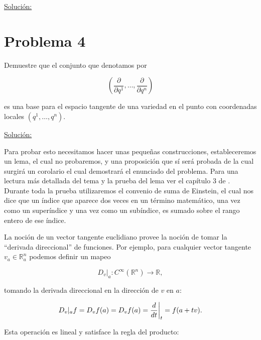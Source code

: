 \documentclass[a4paper,10pt]{article}
\numberwithin{equation}{section}
\newcommand{\zerodel}{.\kern-\nulldelimiterspace}
\begin{document}
\vspace{.3cm}

\underline{Solución:} \vspace{.3cm}

\section{Problema 4}

Demuestre que el conjunto que denotamos por 

$$
\left( \frac{\partial}{\partial q^1},\dots, \frac{\partial}{\partial q^n}\right)
$$

es una base para el espacio tangente de una variedad en el punto con coordenadas 
locales $(q^1,\dots,q^n)$.

\vspace{.3cm}

\underline{Solución:} \vspace{.3cm}

Para probar esto necesitamos hacer unas pequeñas construcciones, estableceremos un 
lema, el cual no probaremos, y una proposición que sí será probada de la cual 
surgirá un corolario el cual demostrará el enunciado del problema. Para una lectura 
más detallada del tema y la prueba del lema ver el capítulo 3 de \cite{lee}. Durante 
toda la prueba utilizaremos el convenio de suma de Einstein, el cual nos dice 
que un índice que aparece dos veces en un término matemático, una vez como un 
superíndice y una vez como un subíndice, es sumado sobre el rango entero de ese 
índice. 

\vspace{.3cm}

La noción de un vector tangente euclidiano provee la noción de tomar la ``derivada 
direccional'' de funciones. Por ejemplo, para cualquier vector tangente $v_a \in \mathbb{R}^n_a$ 
podemos definir un mapeo 

\begin{equation}
 D_v|_a: C^{\infty}(\mathbb{R}^n) \rightarrow \mathbb{R},
\end{equation}

tomando la derivada direccional en la dirección de $v$ en $a$:

\begin{equation}
 D_v|_a f = D_v f(a) = D_v f(a) = \left\zerodel\frac{d}{dt}\right|_t= f(a+tv).
\end{equation}

Esta operación es lineal y satisface la regla del producto:
\end{document}

